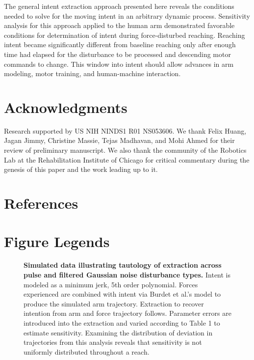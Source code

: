 The general intent extraction approach presented here reveals the conditions needed to solve for the moving intent in an arbitrary dynamic process. Sensitivity analysis for this approach applied to the human arm demonstrated favorable conditions for determination of intent during force-disturbed reaching. Reaching intent became significantly different from baseline reaching only after enough time had elapsed for the disturbance to be processed and descending motor commands to change. This window into intent should allow advances in arm modeling, motor training, and human-machine interaction.


\section*{Acknowledgments}
Research supported by US NIH NINDS1 R01 NS053606.  We thank Felix Huang, Jagan Jimmy, Christine Massie, Tejas Madhavan, and Mohi Ahmed for their review of preliminary manuscript. We also thank the community  of the Robotics Lab at the Rehabilitation Institute of Chicago for critical commentary during the genesis of this paper and the work leading up to it.

\section*{References}

%
%
% 
\pagebreak
\section*{Figure Legends}
%
\begin{figure}
\caption{
{\bf Simulated data illustrating tautology of extraction across pulse and filtered Gaussian noise disturbance types.} Intent is modeled as a minimum jerk, 5th order polynomial. Forces experienced are combined with intent via Burdet et al.'s \cite{burdet2006stability} model to produce the simulated arm trajectory. Extraction to recover intention from arm and force trajectory follows. Parameter errors are introduced into the extraction and varied according to Table 1 to estimate sensitivity. Examining the distribution of deviation in trajectories from this analysis reveals that sensitivity is not uniformly distributed throughout a reach.
}
\label{fig:synthetic}
\end{figure}

